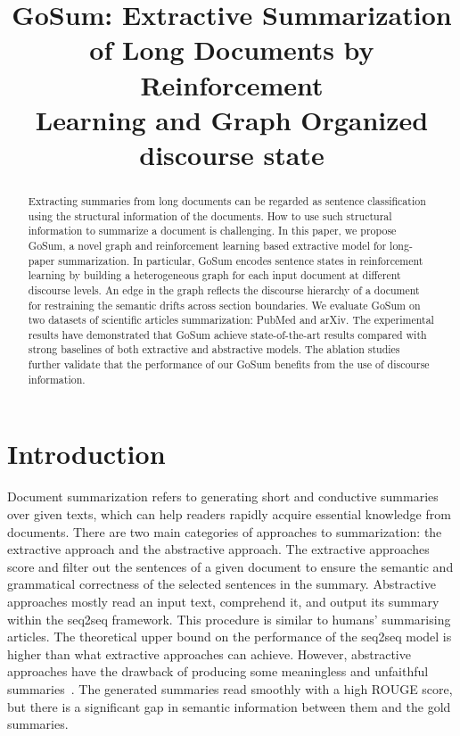 \title{GoSum: Extractive Summarization of Long Documents by Reinforcement \\ Learning and Graph Organized discourse state}



\maketitle

\begin{abstract}
Extracting summaries from long documents can be regarded as sentence classification  using the structural information of the documents.
How to use such structural information to summarize a document is challenging.
In this paper, we propose GoSum, a novel graph and reinforcement learning based extractive model for long-paper summarization.
In particular, GoSum encodes sentence states in reinforcement learning by building a heterogeneous graph for each input document at different discourse levels. An edge in the graph reflects the discourse hierarchy of a document for restraining the semantic drifts across section boundaries.
We evaluate GoSum on two datasets of scientific articles summarization: PubMed and arXiv. 
The experimental results have demonstrated that GoSum achieve state-of-the-art results compared with strong baselines of both extractive and abstractive models.
The ablation studies further validate that the performance of our GoSum benefits from the use of discourse information.

\end{abstract}
\section{Introduction}
\label{sec:intro}

Document summarization refers to generating short and conductive summaries over given texts, which can help readers rapidly acquire essential knowledge from documents.
There are two main categories of approaches to summarization: the extractive approach and the abstractive approach.
The extractive approaches score and filter out the sentences of a given document %
to ensure the semantic and grammatical correctness of the selected sentences in the summary.
Abstractive approaches mostly read an input text, comprehend it, and output its summary within the seq2seq framework.
This procedure is similar to humans'  summarising articles.
The theoretical upper bound on the performance of the seq2seq model is higher than what extractive approaches can achieve.
However, abstractive approaches  have the drawback of producing some meaningless and unfaithful summaries~\cite{fact_2020}. The generated summaries read smoothly with a high ROUGE score, but there is a significant gap in semantic information between them and the gold summaries.

